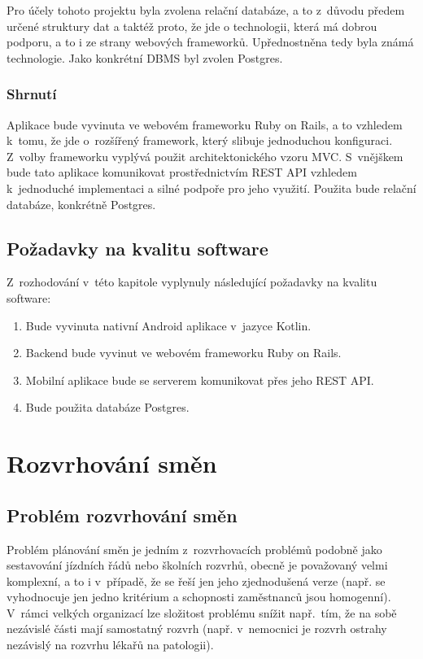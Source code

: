 \documentclass[twoside]{ctuthesis}
\begin{document}
Pro účely tohoto projektu byla zvolena relační databáze, a to z~důvodu předem určené struktury dat a taktéž proto, že jde o technologii, která má dobrou podporu, a to i ze strany webových frameworků. Upřednostněna tedy byla známá technologie. Jako konkrétní DBMS byl zvolen Postgres.


\subsection{Shrnutí}

Aplikace bude vyvinuta ve webovém frameworku Ruby on Rails, a to vzhledem k~tomu, že jde o~rozšířený framework, který slibuje jednoduchou konfiguraci. Z~volby frameworku vyplývá použit architektonického vzoru MVC. S~vnějškem bude tato aplikace komunikovat prostřednictvím REST API vzhledem k~jednoduché implementaci a silné podpoře pro jeho využití. Použita bude relační databáze, konkrétně Postgres.

\section{Požadavky na kvalitu software}

Z~rozhodování v~této kapitole vyplynuly následující požadavky na kvalitu software:

\begin{enumerate}[label=\textbf{S\arabic*.}]
	\item Bude vyvinuta nativní Android aplikace v~jazyce Kotlin.
	\item Backend bude vyvinut ve webovém frameworku Ruby on Rails.
	\item Mobilní aplikace bude se serverem komunikovat přes jeho REST API.
	\item Bude použita databáze Postgres.
\end{enumerate}

\chapter{Rozvrhování směn}
\section{Problém rozvrhování směn}

Problém plánování směn je jedním z~rozvrhovacích problémů podobně jako sestavování jízdních řádů nebo školních rozvrhů, obecně je považovaný velmi komplexní, a to i v~případě, že se řeší jen jeho zjednodušená verze (např. se vyhodnocuje jen jedno kritérium a schopnosti zaměstnanců jsou homogenní). V~rámci velkých organizací lze složitost problému snížit např.~tím, že na sobě nezávislé části mají samostatný rozvrh (např. v~nemocnici je rozvrh ostrahy nezávislý na rozvrhu lékařů na patologii).
\end{document}
